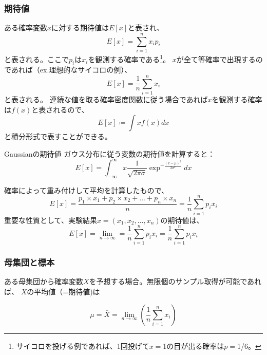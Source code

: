 \subsubsection{期待値}
ある確率変数$x$に対する期待値は$E[x]$と表され、
\begin{equation}
  E[x] = \sum_{i=1}^{n} x_i p_i 
\end{equation}
と表される。ここで$p_i$は$x_i$を観測する確率である\footnote{サイコロを投げる例であれば、1回投げて$x=$1の目が出る確率は$p=$1/6。}。
$x$が全て等確率で出現するのであれば（ex.理想的なサイコロの例）、
\begin{equation}
  E[x] = \frac{1}{n}\sum_{i=1}^{n} x_i
\end{equation}
と表される。
連続な値を取る確率密度関数に従う場合であれば$x$を観測する確率は$f(x)$と表されるので、
\begin{equation}
  E[x] \coloneqq \int xf(x)dx
  \label{eq:fundamental_concepts:expectation_value}
\end{equation}
と積分形式で表すことができる。

\begin{itembox}[l]{Gaussianの期待値}
  ガウス分布に従う変数の期待値を計算すると：
  \begin{equation}
    E[x] = \int_{-\infty}^{\infty} x \frac{1}{\sqrt{2\pi\sigma}} \exp^{-\frac{(x-\mu)^2}{2\sigma^2} } dx
  \end{equation}
\end{itembox}


確率によって重み付けして平均を計算したもので、
\begin{equation}
  E[x] = \frac{p_1\times x_1+ p_2\times x_2+...+ p_n \times x_n}{n} = \frac{1}{n}\sum_{i=1}^{n} p_ix_i
\end{equation}
重要な性質として、実験結果$x=(x_1,x_2,...,x_n)$の期待値は、
\begin{equation}
  E[x] = \lim_{n\to\infty} = \frac{1}{n}\sum_{i=1}^{n} p_ix_i = \frac{1}{n}\sum_{i=1}^{n} p_ix_i
\end{equation}



\subsubsection{母集団と標本}
ある母集団から確率変数$X$を予想する場合。無限個のサンプル取得が可能であれば、 $X$の平均値（=期待値)は

\begin{equation}
  \mu = \bar{X} = \lim_{n\to\infty} \left(\frac{1}{n} \sum_{i=1}^{n} x_i \right)
\end{equation}

